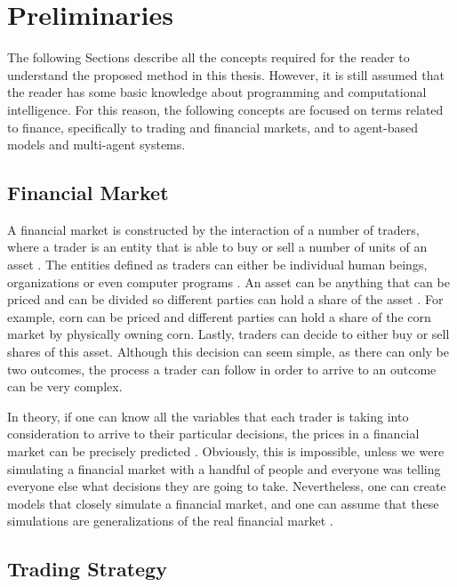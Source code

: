 \chapter{Preliminaries}
\label{chapter:preliminaries}

The following Sections describe all the concepts required for the reader to
understand the proposed method in this thesis. However, it is still assumed that
the reader has some basic knowledge about programming and computational
intelligence. For this reason, the following concepts are focused on terms
related to finance, specifically to trading and financial markets, and to
agent-based models and multi-agent systems.

\section{Financial Market}
\label{section:financial-market}

A financial market is constructed by the interaction of a number of traders,
where a trader is an entity that is able to buy or sell a number of units of an
asset \cite{Huang2009}. The entities defined as traders can either be individual
human beings, organizations or even computer programs \cite{Lu2009}. An asset
can be anything that can be priced and can be divided so different parties can
hold a share of the asset \cite{Avramov2006}. For example, corn can be priced
and different parties can hold a share of the corn market by physically owning
corn. Lastly, traders can decide to either buy or sell shares of this
asset. Although this decision can seem simple, as there can only be two
outcomes, the process a trader can follow in order to arrive to an outcome can
be very complex.

In theory, if one can know all the variables that each trader is taking into
consideration to arrive to their particular decisions, the prices in a financial
market can be precisely predicted \cite{Garcia-Almanza2006}. Obviously, this is
impossible, unless we were simulating a financial market with a handful of
people and everyone was telling everyone else what decisions they are going to
take. Nevertheless, one can create models that closely simulate a financial
market, and one can assume that these simulations are generalizations of the
real financial market \cite{Cai2013}.

\section{Trading Strategy}
\label{section:trading-strategy}

